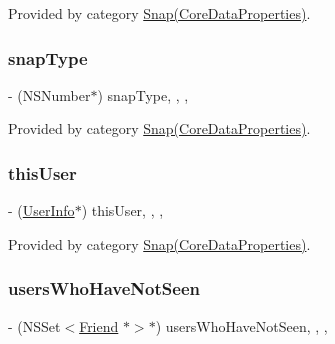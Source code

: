 Provided by category \hyperlink{category_snap_07_core_data_properties_08_ab9069d8e721ed8ce39c12b2591f99833}{Snap(\+Core\+Data\+Properties)}.

\hypertarget{interface_snap_a68257cdbdfeb886f662b217a2d4cadf9}{}\label{interface_snap_a68257cdbdfeb886f662b217a2d4cadf9} 
\subsubsection{\texorpdfstring{snap\+Type}{snapType}}
{\footnotesize\ttfamily -\/ (N\+S\+Number$\ast$) snap\+Type\hspace{0.3cm}{\ttfamily [read]}, {\ttfamily [write]}, {\ttfamily [nonatomic]}, {\ttfamily [retain]}}



Provided by category \hyperlink{category_snap_07_core_data_properties_08_a68257cdbdfeb886f662b217a2d4cadf9}{Snap(\+Core\+Data\+Properties)}.

\hypertarget{interface_snap_a0dd784f55f0e861a4270f6546470f8bd}{}\label{interface_snap_a0dd784f55f0e861a4270f6546470f8bd} 
\subsubsection{\texorpdfstring{this\+User}{thisUser}}
{\footnotesize\ttfamily -\/ (\hyperlink{interface_user_info}{User\+Info}$\ast$) this\+User\hspace{0.3cm}{\ttfamily [read]}, {\ttfamily [write]}, {\ttfamily [nonatomic]}, {\ttfamily [retain]}}



Provided by category \hyperlink{category_snap_07_core_data_properties_08_a0dd784f55f0e861a4270f6546470f8bd}{Snap(\+Core\+Data\+Properties)}.

\hypertarget{interface_snap_a29505408f6f861f86ed6ab15807e3e70}{}\label{interface_snap_a29505408f6f861f86ed6ab15807e3e70} 
\subsubsection{\texorpdfstring{users\+Who\+Have\+Not\+Seen}{usersWhoHaveNotSeen}}
{\footnotesize\ttfamily -\/ (N\+S\+Set$<$\hyperlink{interface_friend}{Friend} $\ast$$>$$\ast$) users\+Who\+Have\+Not\+Seen\hspace{0.3cm}{\ttfamily [read]}, {\ttfamily [write]}, {\ttfamily [nonatomic]}, {\ttfamily [retain]}}



